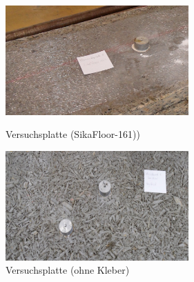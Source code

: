 \begin{figure}[h]
\begin{minipage}[hbt]{7cm}	
	\includegraphics[width=7cm]{Verbindungsmittel/kleber/3Versuchsplatte.jpg}
	\caption{Versuchsplatte (SikaFloor-161))}
	\label{3Versuchsplatte}
\end{minipage}
\hfill
\begin{minipage}[hbt]{7cm}
	\includegraphics[width=7cm]{Verbindungsmittel/kleber/4Versuchsplatte.jpg}
	\caption{Versuchsplatte (ohne Kleber)}
	\label{4Versuchsplatte}
\end{minipage}
\end{figure}





